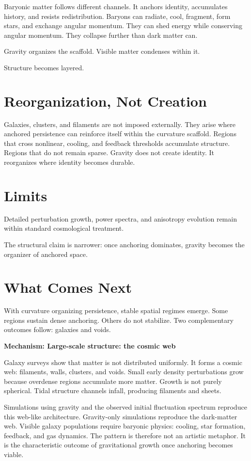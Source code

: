 \documentclass[11pt,twoside,openright]{book}
\newenvironment{mechanismbox}[1]
  {\begin{framed}\noindent\textbf{Mechanism: #1}\par\medskip}
  {\end{framed}}
\begin{document}
Baryonic matter follows different channels. It anchors identity, accumulates history, and resists redistribution. Baryons can radiate, cool, fragment, form stars, and exchange angular momentum. They can shed energy while conserving angular momentum. They collapse further than dark matter can.

Gravity organizes the scaffold. Visible matter condenses within it.

Structure becomes layered.

\section*{Reorganization, Not Creation}

Galaxies, clusters, and filaments are not imposed externally. They arise where anchored persistence can reinforce itself within the curvature scaffold. Regions that cross nonlinear, cooling, and feedback thresholds accumulate structure. Regions that do not remain sparse. Gravity does not create identity. It reorganizes where identity becomes durable.

\section*{Limits}

Detailed perturbation growth, power spectra, and anisotropy evolution remain within standard cosmological treatment.

The structural claim is narrower: once anchoring dominates, gravity becomes the organizer of anchored space.

\section*{What Comes Next}

With curvature organizing persistence, stable spatial regimes emerge. Some regions sustain dense anchoring. Others do not stabilize. Two complementary outcomes follow: galaxies and voids.

\begin{mechanismbox}{Large-scale structure: the cosmic web}

Galaxy surveys show that matter is not distributed uniformly. It forms a cosmic web: filaments, walls, clusters, and voids. Small early density perturbations grow because overdense regions accumulate more matter. Growth is not purely spherical. Tidal structure channels infall, producing filaments and sheets.

Simulations using gravity and the observed initial fluctuation spectrum reproduce this web-like architecture. Gravity-only simulations reproduce the dark-matter web. Visible galaxy populations require baryonic physics: cooling, star formation, feedback, and gas dynamics. The pattern is therefore not an artistic metaphor. It is the characteristic outcome of gravitational growth once anchoring becomes viable.

\end{mechanismbox}
\end{document}
